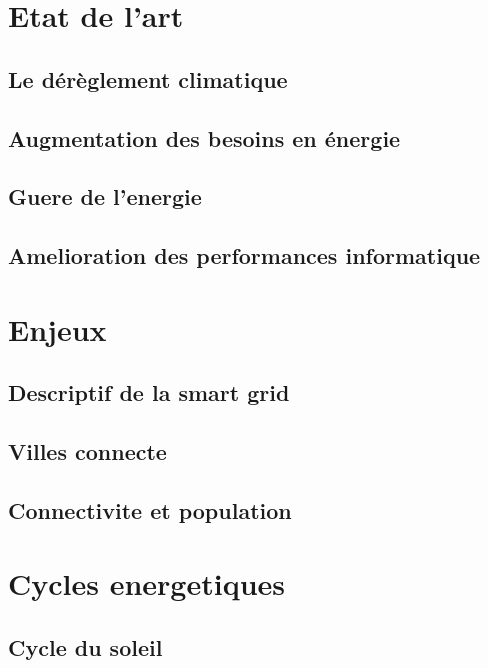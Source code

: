 \chapter{Etat de l’art}
\section{Le dérèglement climatique}
\section{Augmentation des besoins en énergie}
\section{Guere de l'energie}
\section{Amelioration des performances informatique}

\chapter{Enjeux}
\section{Descriptif de la smart grid}




\section{Villes connecte}

\section{Connectivite et population}

\chapter{Cycles energetiques}
\section{Cycle du soleil}
